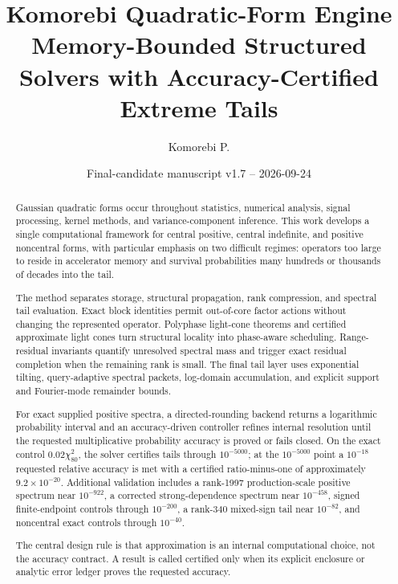 \documentclass[11pt]{article}
\title{\textbf{Komorebi Quadratic-Form Engine}\\
\large Memory-Bounded Structured Solvers with Accuracy-Certified Extreme Tails}
\author{Komorebi P.}
\date{Final-candidate manuscript v1.7 -- 2026-09-24}
\theoremstyle{definition}
\theoremstyle{remark}
\begin{document}
\maketitle

\begin{abstract}
Gaussian quadratic forms occur throughout statistics, numerical analysis,
signal processing, kernel methods, and variance-component inference.  This
work develops a single computational framework for central positive,
central indefinite, and positive noncentral forms, with particular emphasis
on two difficult regimes: operators too large to reside in accelerator memory
and survival probabilities many hundreds or thousands of decades into the
tail.

The method separates storage, structural propagation, rank compression, and
spectral tail evaluation.  Exact block identities permit out-of-core factor
actions without changing the represented operator.  Polyphase light-cone
theorems and certified approximate light cones turn structural locality into
phase-aware scheduling.  Range-residual invariants quantify unresolved
spectral mass and trigger exact residual completion when the remaining rank is
small.  The final tail layer uses exponential tilting, query-adaptive spectral
packets, log-domain accumulation, and explicit support and Fourier-mode
remainder bounds.

For exact supplied positive spectra, a directed-rounding backend returns a
logarithmic probability interval and an accuracy-driven controller refines
internal resolution until the requested multiplicative probability accuracy is
proved or fails closed.  On the exact control
\(0.02\chi^2_{80}\), the solver certifies tails through \(10^{-5000}\);
at the \(10^{-5000}\) point a \(10^{-18}\) requested relative accuracy is
met with a certified ratio-minus-one of approximately
\(9.2\times10^{-20}\).  Additional validation includes a rank-1997
production-scale positive spectrum near \(10^{-922}\), a corrected
strong-dependence spectrum near \(10^{-458}\), signed finite-endpoint controls
through \(10^{-200}\), a rank-340 mixed-sign tail near \(10^{-82}\), and
noncentral exact controls through \(10^{-40}\).

The central design rule is that approximation is an internal computational
choice, not the accuracy contract.  A result is called certified only when
its explicit enclosure or analytic error ledger proves the requested accuracy.
\end{abstract}

\tableofcontents
\clearpage
\end{document}
